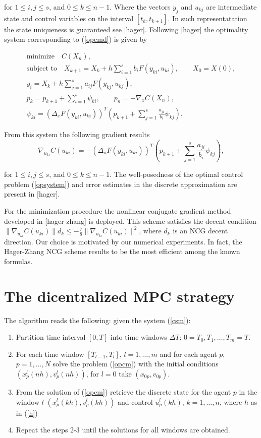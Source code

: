 \documentclass[a4paper,10pt, english]{article}
\newcommand{\D}{\displaystyle}
\begin{document}
 for $1\leq i, j\leq s$, and $0\leq k\leq n-1$.
 Where the vectors $y_j$ and $u_{kj}$ are intermediate state and control variables on the interval $[t_k, t_{k+1}]$. In such representatation the state uniqueness is guaranteed see [hager]. 
Following [hager] the optimality system corresponding to (\ref{opcmd}) is given by

  \begin{align}
   \D
   \mbox{minimize}\quad C(X_n),\\
    \mbox{subject to} \quad X_{k+1} = X_{k} + h\sum_{i=1}^{s}b_iF(y_{ki}, u_{ki}), \qquad X_0 = X(0),\\
 	y_i = X_k + h\sum_{j=1}^{s}a_{ij}F(y_{kj}, u_{kj}),\\
 	p_k = p_{k+1} + \sum_{i=1}^{s}\psi_{ki}, \qquad p_n = - \nabla_xC(X_n),\\
 	\psi_{ki} = (\Delta_x F(y_{ki}, u_{ki}))^{T} \left( p_{k+1} + \sum_{j=1}^{s} \frac{a_{ji}}{b_i}\psi_{kj}\right), 
   \label{opsystem}
   \end{align}

From this system the following gradient results
$$
\nabla_{u_{ki}} C(u_{ki}) = - (\Delta_u F(y_{ki}, u_{ki}))^{T} \left( p_{k+1} + \sum_{j=1}^{s}\frac{a_{ji}}{b_i}\psi_{kj}\right), 
$$

 for $1\leq i, j\leq s$, and $0\leq k\leq n-1$.
 The well-posedness of the optimal control problem (\ref{opsystem}) and error estimates in the discrete approximation are present in [hager].
 
 For the minimization procedure the nonlinear conjugate gradient  method developed in [hager zhang] is deployed.
 This scheme satisfies the decent condition $\|\nabla_{u_{ki}} C(u_{ki})\|d_k \leq -\frac{7}{8}\|\nabla_{u_{ki}} C(u_{ki})\|^2$, where $d_k$ is an NCG decent direction. Our choice is motivated by our numerical experiments. In fact, the Hager-Zhang NCG scheme results to be the most efficient among the known formulas.
 
 \section{The dicentralized MPC strategy}
 
 The algorithm reads the following: given the system (\ref{csm}):
  
 \begin{enumerate}
   \item Partition time interval $[0, T]$ into time windows $\Delta T$: $0 = T_0, T_1, \dots, T_m = T$.
   \item For each time window  $[T_{l-1}, T_{l}]$, $l = 1, \dots, m$ and for each agent $p$, $p = 1, \dots, N$  solve the problem (\ref{opcm}) with the initial conditions $(x^l_p(nh), v^l_p(nh))$, for $l = 0$ take $(x_{0p}, v_{0p})$.
   \item From the solution of (\ref{opcm}) retrieve the discrete state for the agent $p$ in the window $l$ $(x^l_p(kh), v^l_p(kh))$ and control $u^l_p(kh)$, $k = 1, \dots, n$, where $h$ as in (\ref{h}) 
   \item Repeat the steps 2-3 until the solutions for all windows are obtained.
 \end{enumerate}
 
 
\end{document}
